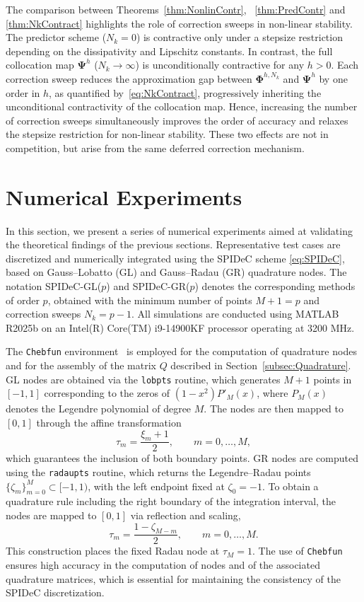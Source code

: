 \documentclass[a4paper,num-refs]{oup-contemporary-spidec}
\begin{document}
The comparison between Theorems~\ref{thm:NonlinContr}, ~\ref{thm:PredContr} and \ref{thm:NkContract} highlights the role of correction sweeps in non-linear stability. The predictor scheme ($N_k=0$) is contractive only under a stepsize restriction depending on the dissipativity and Lipschitz constants. In contrast, the full collocation map $\bm{\Psi}^h$ ($N_k\to \infty$) is unconditionally contractive for any $h>0$. Each correction sweep reduces the approximation gap between $\bm{\Phi}^{h,N_k}$ and $\bm{\Psi}^h$ by one order in $h$, as quantified by~\eqref{eq:NkContract}, progressively inheriting the unconditional contractivity of the collocation map. Hence, increasing the number of correction sweeps simultaneously improves the order of accuracy and relaxes the stepsize restriction for non-linear stability. These two effects are not in competition, but arise from the same deferred correction mechanism.

\section{Numerical Experiments}\label{sec:Numerics}
In this section, we present a series of numerical experiments aimed at validating the theoretical findings of the previous sections. Representative test cases are discretized and numerically integrated using the SPIDeC scheme \eqref{eq:SPIDeC}, based on Gauss--Lobatto (GL) and Gauss--Radau (GR) quadrature nodes. The notation SPIDeC-GL($p$) and SPIDeC-GR($p$) denotes the corresponding methods of order $p$, obtained with the minimum number of points $M+1=p$ and correction sweeps $N_k=p-1$. All simulations are conducted using MATLAB R2025b on an Intel(R) Core(TM) i9-14900KF processor operating at 3200 MHz.

The \texttt{Chebfun} environment~\cite{Driscoll2014ChebfunGuide} is employed for the computation of quadrature nodes and for the assembly of the matrix $Q$ described in Section~\ref{subsec:Quadrature}. GL nodes are obtained via the \texttt{lobpts} routine, which generates $M+1$ points in $[-1,1]$ corresponding to the zeros of $(1-x^2)P'_M(x)$, where $P_M(x)$ denotes the Legendre polynomial of degree $M$. The nodes are then mapped to $[0,1]$ through the affine transformation
\begin{equation}
    \tau_m = \frac{\xi_m + 1}{2}, \qquad m=0,\dots,M,
\end{equation}
which guarantees the inclusion of both boundary points. GR nodes are computed using the \texttt{radaupts} routine, which returns the Legendre--Radau points $\{\zeta_m\}_{m=0}^M \subset [-1,1)$, with the left endpoint fixed at $\zeta_0=-1$. To obtain a quadrature rule including the right boundary of the integration interval, the nodes are mapped to $[0,1]$ via reflection and scaling,
\begin{equation}
    \tau_m = \frac{1 - \zeta_{M-m}}{2}, \qquad m=0,\dots,M.
\end{equation}
This construction places the fixed Radau node at $\tau_M=1$. The use of \texttt{Chebfun} ensures high accuracy in the computation of nodes and of the associated quadrature matrices, which is essential for maintaining the consistency of the SPIDeC discretization.
\end{document}
